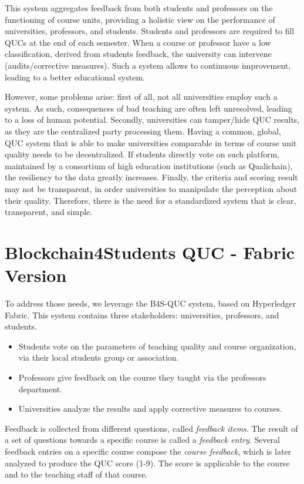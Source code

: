 \documentclass[12pt,a4paper]{article}
\theoremstyle{definition}
\begin{document}
This system aggregates feedback from both students and professors on the functioning of course units, providing a holistic view on the performance of universities, professors, and students. Students and professors are required to fill QUCs at the end of each semester. When a course or professor have a low classification, derived from students feedback, the university can intervene (audits/corrective measures). Such a system allows to continuous improvement, leading to a better educational system.

However, some problems arise: first of all, not all universities employ such a system. As such, consequences of bad teaching are often left unresolved, leading to a loss of human potential. Secondly, universities can tamper/hide QUC results, as they are the centralized party processing them. Having a common, global, QUC system that is able to make universities comparable in terms of course unit quality needs to be decentralized. If students directly vote on such platform, maintained by a consortium of high education institutions (such as Qualichain), the resiliency to the data greatly increases. Finally, the criteria and scoring result may not be transparent, in order universities to manipulate the perception about their quality. Therefore, there is the need for a standardized system that is clear, transparent, and simple.

\section{Blockchain4Students QUC - Fabric Version}
To address those needs, we leverage the B4S-QUC system, based on Hyperledger Fabric. This system contains three stakeholders: universities, professors, and students.

\begin{itemize}
    \item Students vote on the parameters of teaching quality and course organization, via their local students group or association.
    \item Professors give feedback on the course they taught via the professors department. 
    \item Universities analyze the results and apply corrective measures to courses.

\end{itemize} 

Feedback is collected from different questions, called \emph{feedback items}. The result of a set of questions towards a specific course is called a \emph{feedback entry}. Several feedback entries on a specific course compose the \emph{course feedback}, which is later analyzed to produce the QUC score (1-9). The score is applicable to the course and to the teaching staff of that course.
\end{document}
